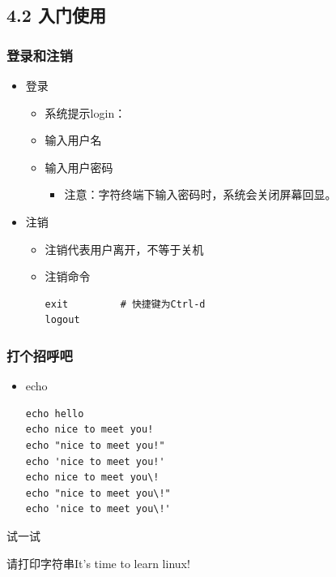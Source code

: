 \documentclass[xcolor=svgnames,presentation]{beamer}
\begin{document}
\subsection{4.2 入门使用}
\label{sec-4-2}
\begin{frame}[fragile]
\frametitle{登录和注销}
\label{sec-4-2-1}
\begin{itemize}

\item 登录
\label{sec-4-2-1-1}%
\begin{itemize}

\item 系统提示login：
\label{sec-4-2-1-1-1}%

\item 输入用户名
\label{sec-4-2-1-1-2}%

\item 输入用户密码
\label{sec-4-2-1-1-3}%
\begin{itemize}

\item 注意：字符终端下输入密码时，系统会关闭屏幕回显。
\label{sec-4-2-1-1-3-1}%
\end{itemize} %
\end{itemize} %

\item 注销
\label{sec-4-2-1-2}%
\begin{itemize}

\item 注销代表用户离开，不等于关机
\label{sec-4-2-1-2-1}%

\item 注销命令\\
\label{sec-4-2-1-2-2}%
\begin{verbatim}
exit         # 快捷键为Ctrl-d
logout
\end{verbatim}
\end{itemize} %
\end{itemize} %
\end{frame}
\begin{frame}[fragile]
\frametitle{打个招呼吧}
\label{sec-4-2-2}
\begin{itemize}

\item echo\\
\label{sec-4-2-2-1}%
\begin{verbatim}
echo hello
echo nice to meet you!
echo "nice to meet you!"
echo 'nice to meet you!'
echo nice to meet you\!
echo "nice to meet you\!"
echo 'nice to meet you\!'
\end{verbatim}
\end{itemize} %
\begin{block}{试一试}
\label{sec-4-2-2-2}

请打印字符串It's time to learn linux!
\end{block}
\end{frame}
\end{document}
